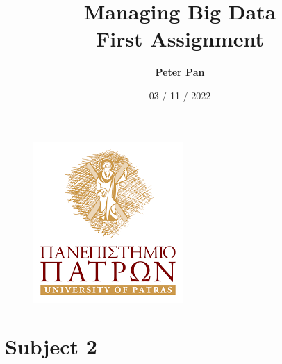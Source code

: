 \documentclass[10pt,a4paper]{article}
\begin{document}
	\begin{figure}
		\includegraphics[scale=0.7]{econpic}
		\centering
	\end{figure}
	\title { {\Huge Managing Big Data} \\ 
		First Assignment }
	\author{
		\textbf{Peter Pan} \\	
	}
	\date{ 03 / 11 / 2022 }
	
	
	\maketitle
	
	\newpage
	
	\tableofcontents
	\newpage
	\section{Subject 2}
	
\end{document}
